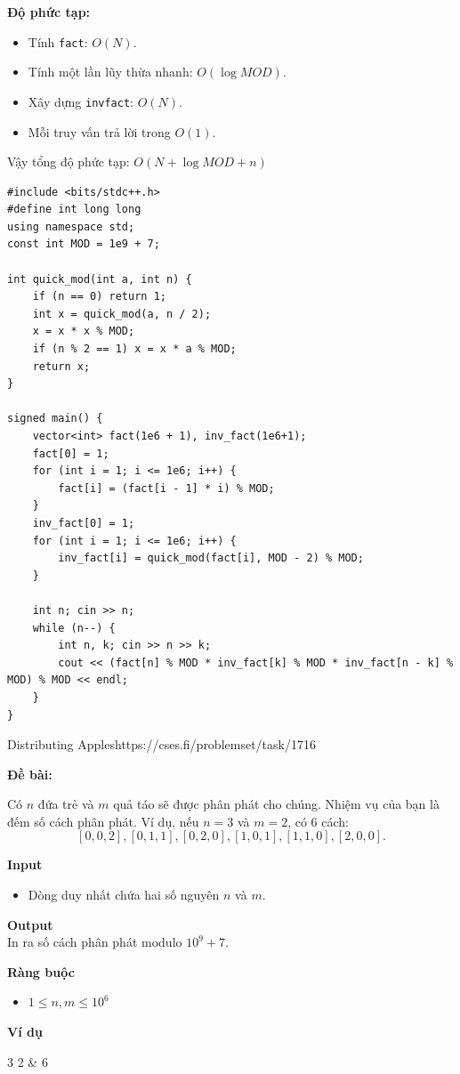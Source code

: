 \textbf{Độ phức tạp:}
\begin{itemize}
    \item Tính \texttt{fact}: $O(N)$.
    \item Tính một lần lũy thừa nhanh: $O(\log MOD)$.
    \item Xây dựng \texttt{invfact}: $O(N)$.
    \item Mỗi truy vấn trả lời trong $O(1)$.
\end{itemize}

Vậy tổng độ phức tạp: $O(N + \log MOD + n)$

\begin{lstlisting}[title=\centering \textbf{Cài đặt}]
#include <bits/stdc++.h> 
#define int long long
using namespace std;
const int MOD = 1e9 + 7;
 
int quick_mod(int a, int n) {
	if (n == 0) return 1;
	int x = quick_mod(a, n / 2);
	x = x * x % MOD;
	if (n % 2 == 1) x = x * a % MOD;
	return x;
}
 
signed main() {
	vector<int> fact(1e6 + 1), inv_fact(1e6+1);
	fact[0] = 1;
	for (int i = 1; i <= 1e6; i++) {
		fact[i] = (fact[i - 1] * i) % MOD;
	}
	inv_fact[0] = 1;
	for (int i = 1; i <= 1e6; i++) {
		inv_fact[i] = quick_mod(fact[i], MOD - 2) % MOD;
	}
 
	int n; cin >> n;
	while (n--) {
		int n, k; cin >> n >> k;
		cout << (fact[n] % MOD * inv_fact[k] % MOD * inv_fact[n - k] % MOD) % MOD << endl;
	}
}
\end{lstlisting}



\begin{baitap}{Distributing Apples}{https://cses.fi/problemset/task/1716}

\textbf{Đề bài:}  

Có $n$ đứa trẻ và $m$ quả táo sẽ được phân phát cho chúng. Nhiệm vụ của bạn là đếm số cách phân phát.  
Ví dụ, nếu $n=3$ và $m=2$, có 6 cách:  
\[
[0,0,2], [0,1,1], [0,2,0], [1,0,1], [1,1,0], [2,0,0].
\]

\textbf{Input}
\begin{itemize}[noitemsep]
    \item Dòng duy nhất chứa hai số nguyên $n$ và $m$.
\end{itemize}

\textbf{Output} \\
In ra số cách phân phát modulo $10^9+7$.

\textbf{Ràng buộc}
\begin{itemize}[noitemsep]
    \item $1 \le n,m \le 10^6$
\end{itemize}

\textbf{Ví dụ}

\begin{sampleio}
3 2 & 6 \\
\end{sampleio}

\end{baitap}


